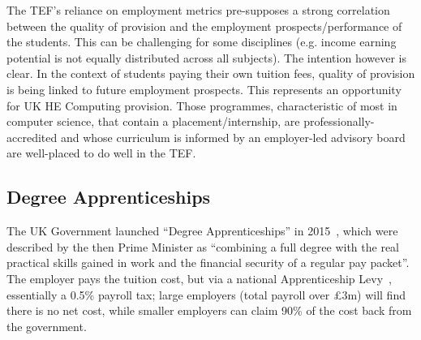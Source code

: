 \documentclass[conference]{IEEEtran}
\begin{document}

The TEF's reliance on employment metrics pre-supposes a strong
correlation between the quality of provision and the employment
prospects/performance of the students. This can be challenging for
some disciplines (e.g. income earning potential is not equally
distributed across all subjects). The intention however is clear. In
the context of students paying their own tuition fees, quality of
provision is being linked to future employment prospects. This
represents an opportunity for UK HE Computing provision. Those
programmes, characteristic of most in computer science, that contain a
placement/internship, are professionally-accredited and whose
curriculum is informed by an employer-led advisory board are
well-placed to do well in the TEF.

\subsection{Degree Apprenticeships}\label{sec:DA}

The UK Government launched ``Degree Apprenticeships'' in
2015~\cite{BIS2015a}, which were described by the then Prime Minister
as ``combining a full degree with the real practical skills gained in
work and the financial security of a regular pay packet''. The
employer pays the tuition cost, but via a national Apprenticeship
Levy~\cite{HMRC2016a}, essentially a 0.5\% payroll tax; large
employers (total payroll over \pounds3m) will find there is no net
cost, while smaller employers can claim 90\% of the cost back from the
government.
\end{document}
